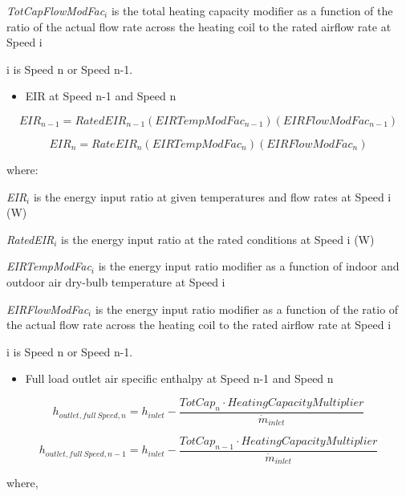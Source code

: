 \emph{TotCapFlowModFac\(_{i}\)} is the total heating capacity modifier as a function of the ratio of the actual flow rate across the heating coil to the rated airflow rate at Speed i

i is Speed n or Speed n-1.

\begin{itemize}
  \item EIR at Speed n-1 and Speed n
\end{itemize}

\begin{equation}
EI{R_{n - 1}} = RatedEI{R_{n - 1}}\left( {EIRTempModFa{c_{n - 1}}} \right)\left( {EIRFlowModFa{c_{n - 1}}} \right)
\end{equation}

\begin{equation}
EI{R_n} = RateEI{R_n}\left( {EIRTempModFa{c_n}} \right)\left( {EIRFlowModFa{c_n}} \right)
\end{equation}

where:

\emph{EIR\(_{i}\)} is the energy input ratio at given temperatures and flow rates at Speed i (W)

\emph{RatedEIR\(_{i}\)} is the energy input ratio at the rated conditions at Speed i (W)

\emph{EIRTempModFac\(_{i}\)} is the energy input ratio modifier as a function of indoor and outdoor air dry-bulb temperature at Speed i

\emph{EIRFlowModFac\(_{i}\)} is the energy input ratio modifier as a function of the ratio of the actual flow rate across the heating coil to the rated airflow rate at Speed i

i is Speed n or Speed n-1.

\begin{itemize}
  \item Full load outlet air specific enthalpy at Speed n-1 and Speed n
\end{itemize}

\begin{equation}
  h_{outlet,full~Speed,n} = h_{inlet} - \frac{TotCap_{n} \cdot HeatingCapacityMultiplier}{\dot{m}_{inlet}}
\end{equation}

\begin{equation}
  h_{outlet,full~Speed,n-1} = h_{inlet} - \frac{TotCap_{n-1} \cdot HeatingCapacityMultiplier}{\dot{m}_{inlet}}
\end{equation}

where,

